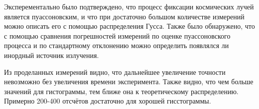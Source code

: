 \documentclass[12pt,a4paper]{article}
\begin{document}
Эксперементально было подтверждено, что процесс фиксации космических лучей является пуассоновским, и что при достаточно большом количестве измерений можно описать его с помощью распределения Гусса. Также было обнаружено, что с помощью сравнения погрешностей измерений по оценке пуассоновского процесса и по стандартному отклонению можно определить появлялся ли инордный источник излучения.

Из проделанных измерений видно, что дальнейшее увеличение точности невозможно без увеличения времени эксперимента. Также видно, что чем больше значений для гистограммы, тем ближе она к теоретическому распределению. Примерно 200-400 отсчётов достаточно для хорошей гисстограммы.
\end{document}

